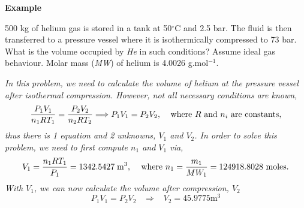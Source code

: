 \medskip
   \begin{MyExample}{\begin{center}{\bf Example}\end{center}}
     \begin{example}\label{Chapter:Intro_Property_of_Gases:Example2}
       500 kg of helium gas is stored in a tank at 50$^{\circ}$C and 2.5 bar. The fluid is then transferred to a pressure vessel where it is isothermically compressed to 73 bar.  What is the volume occupied by {\it He} in such conditions? Assume ideal gas behaviour. Molar mass ({\it MW}) of helium is 4.0026 g.mol$^{-1}$.

       {\it In this problem, we need to calculate the volume of helium at the pressure vessel after isothermal compression. However, not all necessary conditions are known, \ie}
       \begin{displaymath}
         \displaystyle\frac{P_{1}V_{1}}{n_{1} R T_{1}} = \displaystyle\frac{P_{2}V_{2}}{n_{2} R T_{2}} \Longrightarrow P_{1}V_{1} = P_{2}V_{2},\;\;\;\;\text{where }R\text{ and } n_{i}\text{ are constants},
       \end{displaymath}
           {\it thus there is 1 equation and 2 unknowns, $V_{1}$ and $V_{2}$. In order to solve this problem, we need to first compute $n_{1}$ and $V_{1}$ via, }
           \begin{displaymath}
              V_{1} = \displaystyle\frac{n_{1}R T_{1}}{P_{1}} = 1342.5427\;\text{m}^{3},\;\;\;\text{ where } n_{1} = \displaystyle\frac{m_{1}}{MW_{1}} =  124918.8028\text{ moles}.
           \end{displaymath}
           {\it With $V_{1}$, we can now calculate the volume after compression, $V_{2}$}
           \begin{displaymath}
              P_{1}V_{1} = P_{2}V_{2} \;\;\; \Longrightarrow\;\;\; V_{2} = 45.9775 \text{m}^{3}
           \end{displaymath}
           
     \end{example}
   \end{MyExample}
   
